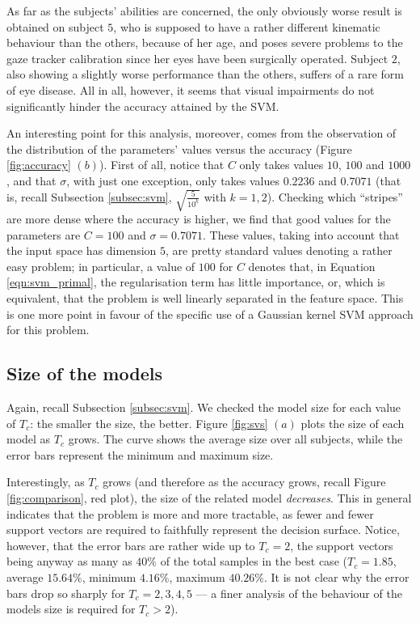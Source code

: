 \documentclass[a4paper,10pt,conference]{ieeeconf}
\begin{document}
As far as the subjects' abilities are concerned, the only obviously
worse result is obtained on subject $5$, who is supposed to have a
rather different kinematic behaviour than the others, because of her
age, and poses severe problems to the gaze tracker calibration since
her eyes have been surgically operated. Subject $2$, also showing a
slightly worse performance than the others, suffers of a rare form of
eye disease. All in all, however, it seems that visual impairments do
not significantly hinder the accuracy attained by the SVM.

An interesting point for this analysis, moreover, comes from the
observation of the distribution of the parameters' values versus the
accuracy (Figure \ref{fig:accuracy} $(b)$). First of all, notice that
$C$ only takes values $10$, $100$ and $1000$, and that $\sigma$, with
just one exception, only takes values $0.2236$ and $0.7071$ (that is,
recall Subsection \ref{subsec:svm}, $\sqrt{\frac{5}{10^{k}}}$ with
$k=1,2$). Checking which ``stripes'' are more dense where the accuracy
is higher, we find that good values for the parameters are $C=100$ and
$\sigma=0.7071$. These values, taking into account that the input
space has dimension $5$, are pretty standard values denoting a rather
easy problem; in particular, a value of $100$ for $C$ denotes that, in
Equation \ref{eqn:svm_primal}, the regularisation term has little
importance, or, which is equivalent, that the problem is well linearly
separated in the feature space. This is one more point in favour of
the specific use of a Gaussian kernel SVM approach for this
problem.

\subsection{Size of the models}

Again, recall Subsection \ref{subsec:svm}. We checked the model size
for each value of $T_c$: the smaller the size, the better. Figure
\ref{fig:svs} $(a)$ plots the size of each model as $T_c$ grows. The
curve shows the average size over all subjects, while the error bars
represent the minimum and maximum size.

Interestingly, as $T_c$ grows (and therefore as the accuracy grows,
recall Figure \ref{fig:comparison}, red plot), the size of the related
model \emph{decreases}. This in general indicates that the problem is
more and more tractable, as fewer and fewer support vectors are
required to faithfully represent the decision surface. Notice,
however, that the error bars are rather wide up to $T_c=2$, the
support vectors being anyway as many as $40\%$ of the total samples in
the best case ($T_c=1.85$, average $15.64\%$, minimum $4.16\%$,
maximum $40.26\%$. It is not clear why the error bars drop so sharply
for $T_c=2,3,4,5$ --- a finer analysis of the behaviour of the models
size is required for $T_c>2$).
\end{document}

